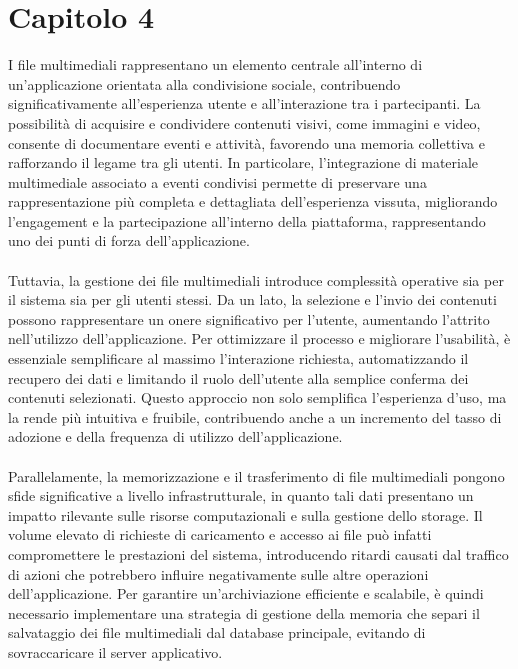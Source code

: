 \chapter{Capitolo 4}

I file multimediali rappresentano un elemento centrale 
all'interno di un'applicazione orientata alla condivisione sociale,
contribuendo significativamente all'esperienza utente e all'interazione tra i partecipanti.
La possibilità di acquisire e condividere contenuti visivi, come immagini e video, 
consente di documentare eventi e attività,
favorendo una memoria collettiva e rafforzando il legame tra gli utenti.
In particolare, l'integrazione di materiale multimediale associato a eventi condivisi 
permette di preservare una rappresentazione più completa e dettagliata dell'esperienza vissuta,
migliorando l'engagement e la partecipazione all'interno della piattaforma, 
rappresentando uno dei punti di forza dell'applicazione.\\
\\
Tuttavia, la gestione dei file multimediali introduce complessità operative 
sia per il sistema sia per gli utenti stessi.
Da un lato, la selezione e l'invio dei contenuti 
possono rappresentare un onere significativo per l'utente, 
aumentando l'attrito nell'utilizzo dell'applicazione.
Per ottimizzare il processo e migliorare l'usabilità, 
è essenziale semplificare al massimo l'interazione richiesta,
automatizzando il recupero dei dati e limitando il ruolo dell'utente 
alla semplice conferma dei contenuti selezionati.
Questo approccio non solo semplifica l'esperienza d'uso, 
ma la rende più intuitiva e fruibile,
contribuendo anche a un incremento del tasso di adozione e della frequenza di utilizzo dell'applicazione.\\
\\
Parallelamente, la memorizzazione e il trasferimento di file multimediali 
pongono sfide significative a livello infrastrutturale,
in quanto tali dati presentano un impatto rilevante 
sulle risorse computazionali e sulla gestione dello storage.
Il volume elevato di richieste di caricamento e accesso ai file 
può infatti compromettere le prestazioni del sistema,
introducendo ritardi causati dal traffico di azioni 
che potrebbero influire negativamente sulle altre operazioni dell'applicazione.
Per garantire un'archiviazione efficiente e scalabile, 
è quindi necessario implementare una strategia di gestione della memoria
che separi il salvataggio dei file multimediali dal database principale, 
evitando di sovraccaricare il server applicativo.
